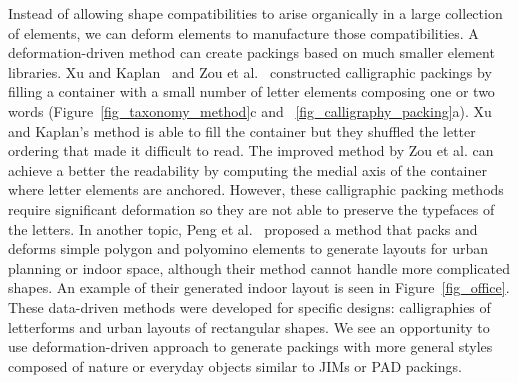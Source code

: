 \nnewtext
{
Instead of allowing shape compatibilities to arise organically in a large collection of elements, 
we can deform elements to manufacture those compatibilities.
A deformation-driven method can create packings based on much smaller element libraries.
Xu and Kaplan~\cite{Xu2007} and Zou et al.~\cite{Zou2016} constructed calligraphic packings by filling a container with a small
number of letter elements composing one or two words (Figure~\ref{fig_taxonomy_method}c and ~\ref{fig_calligraphy_packing}a). 
Xu and Kaplan's method is able to fill the container but they shuffled the letter ordering that made it difficult to read.
The improved method by Zou et al. can achieve a better the readability by computing
the medial axis of the container where letter elements are anchored.
However, these calligraphic packing methods require significant deformation 
so they are not able to preserve the typefaces of the letters.
In another topic, Peng et al.~\cite{Peng2014} proposed a method that packs and deforms
simple polygon and polyomino elements to generate layouts for urban planning or indoor space, 
although their method cannot handle more complicated shapes. 
An example of their generated indoor layout is seen in Figure~\ref{fig_office}.
These data-driven methods were developed for specific designs: calligraphies of letterforms and urban layouts of rectangular shapes.
We see an opportunity to use deformation-driven approach to generate packings with more general styles composed
of nature or everyday objects similar to JIMs or PAD packings.
}


